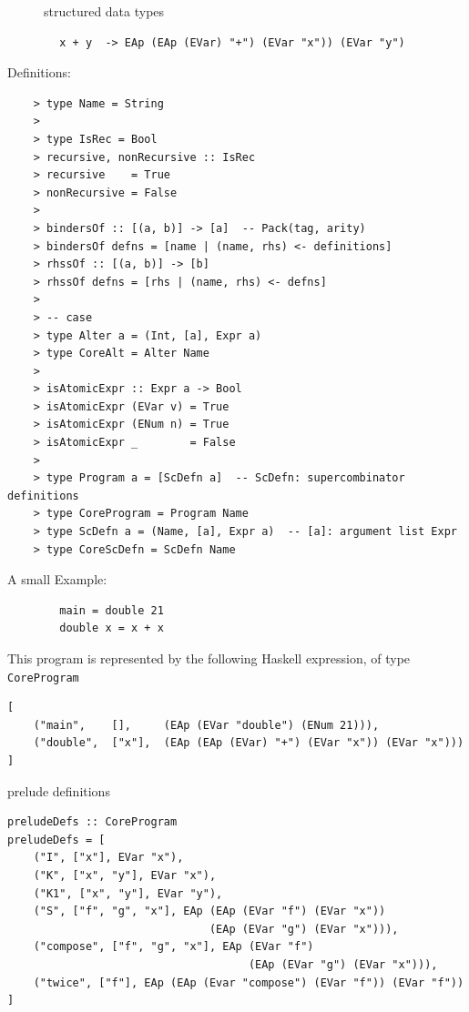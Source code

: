 \documentclass [11pt, a4paper]{article}
\begin{document}
\begin{flushleft}
    \begin{figure}[htb]
        \caption{\label{1} structured data types}    
    \end{figure}

    \begin{verbatim}
        x + y  -> EAp (EAp (EVar) "+") (EVar "x")) (EVar "y")
    \end{verbatim}

    Definitions:
    \begin{verbatim}
    > type Name = String
    >
    > type IsRec = Bool
    > recursive, nonRecursive :: IsRec
    > recursive    = True
    > nonRecursive = False
    >
    > bindersOf :: [(a, b)] -> [a]  -- Pack(tag, arity)
    > bindersOf defns = [name | (name, rhs) <- definitions]
    > rhssOf :: [(a, b)] -> [b]
    > rhssOf defns = [rhs | (name, rhs) <- defns]
    > 
    > -- case
    > type Alter a = (Int, [a], Expr a)
    > type CoreAlt = Alter Name
    > 
    > isAtomicExpr :: Expr a -> Bool
    > isAtomicExpr (EVar v) = True
    > isAtomicExpr (ENum n) = True
    > isAtomicExpr _        = False
    > 
    > type Program a = [ScDefn a]  -- ScDefn: supercombinator definitions
    > type CoreProgram = Program Name
    > type ScDefn a = (Name, [a], Expr a)  -- [a]: argument list Expr
    > type CoreScDefn = ScDefn Name
    \end{verbatim}

    \newpage
    A small Example: 
    \begin{verbatim}
        main = double 21
        double x = x + x
    \end{verbatim}
    This program is represented by the following Haskell expression, of type \texttt{CoreProgram}
    \begin{verbatim}
[
    ("main",    [],     (EAp (EVar "double") (ENum 21))),
    ("double",  ["x"],  (EAp (EAp (EVar) "+") (EVar "x")) (EVar "x")))
]
    \end{verbatim}

    prelude definitions
    \begin{verbatim}
preludeDefs :: CoreProgram
preludeDefs = [
    ("I", ["x"], EVar "x"),
    ("K", ["x", "y"], EVar "x"),
    ("K1", ["x", "y"], EVar "y"),
    ("S", ["f", "g", "x"], EAp (EAp (EVar "f") (EVar "x"))  
                               (EAp (EVar "g") (EVar "x"))),
    ("compose", ["f", "g", "x"], EAp (EVar "f") 
                                     (EAp (EVar "g") (EVar "x"))),
    ("twice", ["f"], EAp (EAp (Evar "compose") (EVar "f")) (EVar "f"))
]
    \end{verbatim}


\end{flushleft}
\end{document}
